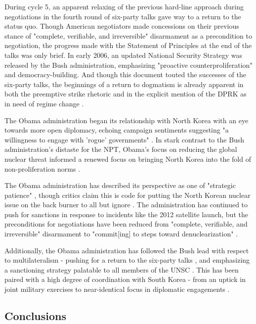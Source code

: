 \documentclass{article}
\begin{document}
During cycle 5, an apparent relaxing of the previous hard-line approach during negotiations in the fourth round of six-party talks gave way to a return to the status quo. Though American negotiators made concessions on their previous stance of "complete, verifiable, and irreversible" disarmament as a precondition to negotiation, the progress made with the Statement of Principles at the end of the talks was only brief\cite{huntley}. In early 2006, an updated National Security Strategy was released by the Bush administration, emphasizing "proactive counterproliferation" and democracy-building\cite{nss06}. And though this document touted the successes of the six-party talks, the beginnings of a return to dogmatism is already apparent in both the preemptive strike rhetoric and in the explicit mention of the DPRK as in need of regime change \cite{nss06}.

The Obama administration began its relationship with North Korea with an eye towards more open diplomacy, echoing campaign sentiments suggesting "a willingness to engage with 'rogue' governments" \cite{crs13}. In stark contrast to the Bush administration's distaste for the NPT\cite{huntley}, Obama's focus on reducing the global nuclear threat informed a renewed focus on bringing North Korea into the fold of non-proliferation norms \cite{crs13}.

The Obama administration has described its perspective as one of "strategic patience" \cite{crs13}, though critics claim this is code for putting the North Korean nuclear issue on the back burner to all but ignore \cite{green}. The administration has continued to push for sanctions in response to incidents like the 2012 satellite launch, but the preconditions for negotiations have been reduced from "complete, verifiable, and irreversible" disarmament \cite{huntley} to "commit[ing] to steps toward denuclearization" \cite{crs13}.

Additionally, the Obama administration has followed the Bush lead with respect to multilateralism - pushing for a return to the six-party talks \cite{crs13}, and emphasizing a sanctioning strategy palatable to all members of the UNSC \cite{green}. This has been paired with a high degree of coordination with South Korea - from an uptick in joint military exercises to near-identical focus in diplomatic engagements \cite{crs13}.

\subsection{Conclusions}
\end{document}
